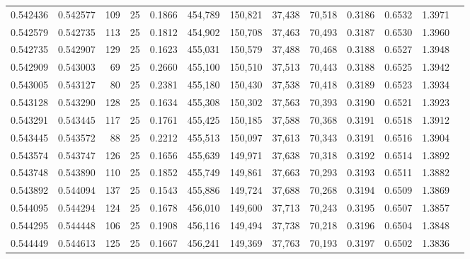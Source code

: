 \begin{tabular}{rrrrrrrrrrrrr}
0.542436 & 0.542577 &   109 &  25 &                                     0.1866 & 454,789 & 150,821 &  37,438 &  70,518 & 0.3186 & 0.6532 & 1.3971 \\
0.542579 & 0.542735 &   113 &  25 &                                     0.1812 & 454,902 & 150,708 &  37,463 &  70,493 & 0.3187 & 0.6530 & 1.3960 \\
0.542735 & 0.542907 &   129 &  25 &                                     0.1623 & 455,031 & 150,579 &  37,488 &  70,468 & 0.3188 & 0.6527 & 1.3948 \\
0.542909 & 0.543003 &    69 &  25 &                                     0.2660 & 455,100 & 150,510 &  37,513 &  70,443 & 0.3188 & 0.6525 & 1.3942 \\
0.543005 & 0.543127 &    80 &  25 &                                     0.2381 & 455,180 & 150,430 &  37,538 &  70,418 & 0.3189 & 0.6523 & 1.3934 \\
0.543128 & 0.543290 &   128 &  25 &                                     0.1634 & 455,308 & 150,302 &  37,563 &  70,393 & 0.3190 & 0.6521 & 1.3923 \\
0.543291 & 0.543445 &   117 &  25 &                                     0.1761 & 455,425 & 150,185 &  37,588 &  70,368 & 0.3191 & 0.6518 & 1.3912 \\
0.543445 & 0.543572 &    88 &  25 &                                     0.2212 & 455,513 & 150,097 &  37,613 &  70,343 & 0.3191 & 0.6516 & 1.3904 \\
0.543574 & 0.543747 &   126 &  25 &                                     0.1656 & 455,639 & 149,971 &  37,638 &  70,318 & 0.3192 & 0.6514 & 1.3892 \\
0.543748 & 0.543890 &   110 &  25 &                                     0.1852 & 455,749 & 149,861 &  37,663 &  70,293 & 0.3193 & 0.6511 & 1.3882 \\
0.543892 & 0.544094 &   137 &  25 &                                     0.1543 & 455,886 & 149,724 &  37,688 &  70,268 & 0.3194 & 0.6509 & 1.3869 \\
0.544095 & 0.544294 &   124 &  25 &                                     0.1678 & 456,010 & 149,600 &  37,713 &  70,243 & 0.3195 & 0.6507 & 1.3857 \\
0.544295 & 0.544448 &   106 &  25 &                                     0.1908 & 456,116 & 149,494 &  37,738 &  70,218 & 0.3196 & 0.6504 & 1.3848 \\
0.544449 & 0.544613 &   125 &  25 &                                     0.1667 & 456,241 & 149,369 &  37,763 &  70,193 & 0.3197 & 0.6502 & 1.3836 \\

\end{tabular}
